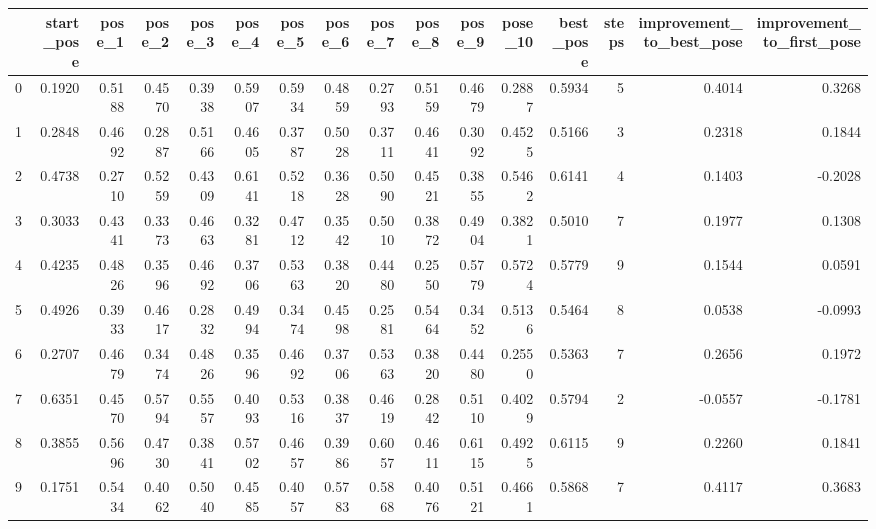 \begin{tabular}{lrrrrrrrrrrrrrrr}
\toprule
{} &  start\_pose &  pose\_1 &  pose\_2 &  pose\_3 &  pose\_4 &  pose\_5 &  pose\_6 &  pose\_7 &  pose\_8 &  pose\_9 &  pose\_10 &  best\_pose &  steps &  improvement\_to\_best\_pose &  improvement\_to\_first\_pose \\
\midrule
0   &      0.1920 &  0.5188 &  0.4570 &  0.3938 &  0.5907 &  0.5934 &  0.4859 &  0.2793 &  0.5159 &  0.4679 &   0.2887 &     0.5934 &      5 &                    0.4014 &                     0.3268 \\
1   &      0.2848 &  0.4692 &  0.2887 &  0.5166 &  0.4605 &  0.3787 &  0.5028 &  0.3711 &  0.4641 &  0.3092 &   0.4525 &     0.5166 &      3 &                    0.2318 &                     0.1844 \\
2   &      0.4738 &  0.2710 &  0.5259 &  0.4309 &  0.6141 &  0.5218 &  0.3628 &  0.5090 &  0.4521 &  0.3855 &   0.5462 &     0.6141 &      4 &                    0.1403 &                    -0.2028 \\
3   &      0.3033 &  0.4341 &  0.3373 &  0.4663 &  0.3281 &  0.4712 &  0.3542 &  0.5010 &  0.3872 &  0.4904 &   0.3821 &     0.5010 &      7 &                    0.1977 &                     0.1308 \\
4   &      0.4235 &  0.4826 &  0.3596 &  0.4692 &  0.3706 &  0.5363 &  0.3820 &  0.4480 &  0.2550 &  0.5779 &   0.5724 &     0.5779 &      9 &                    0.1544 &                     0.0591 \\
5   &      0.4926 &  0.3933 &  0.4617 &  0.2832 &  0.4994 &  0.3474 &  0.4598 &  0.2581 &  0.5464 &  0.3452 &   0.5136 &     0.5464 &      8 &                    0.0538 &                    -0.0993 \\
6   &      0.2707 &  0.4679 &  0.3474 &  0.4826 &  0.3596 &  0.4692 &  0.3706 &  0.5363 &  0.3820 &  0.4480 &   0.2550 &     0.5363 &      7 &                    0.2656 &                     0.1972 \\
7   &      0.6351 &  0.4570 &  0.5794 &  0.5557 &  0.4093 &  0.5316 &  0.3837 &  0.4619 &  0.2842 &  0.5110 &   0.4029 &     0.5794 &      2 &                   -0.0557 &                    -0.1781 \\
8   &      0.3855 &  0.5696 &  0.4730 &  0.3841 &  0.5702 &  0.4657 &  0.3986 &  0.6057 &  0.4611 &  0.6115 &   0.4925 &     0.6115 &      9 &                    0.2260 &                     0.1841 \\
9   &      0.1751 &  0.5434 &  0.4062 &  0.5040 &  0.4585 &  0.4057 &  0.5783 &  0.5868 &  0.4076 &  0.5121 &   0.4661 &     0.5868 &      7 &                    0.4117 &                     0.3683 \\

\end{tabular}
